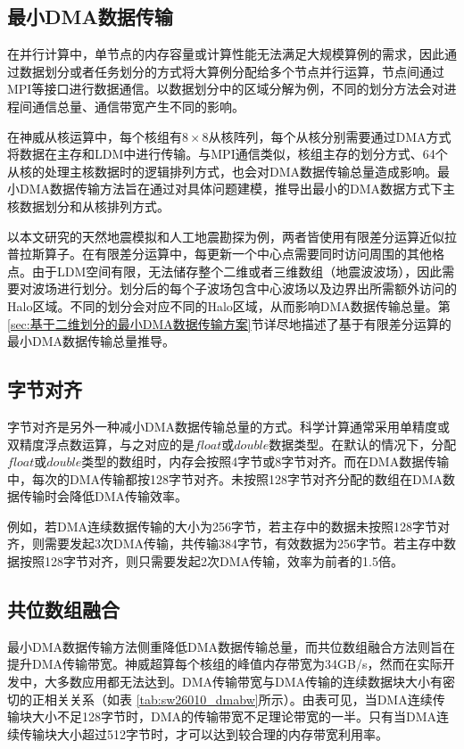 \documentclass[degree=doctor]{thuthesis}
\begin{document}
\subsection{最小DMA数据传输}

在并行计算中，单节点的内存容量或计算性能无法满足大规模算例的需求，因此通过数据划分或者任务划分的方式将大算例分配给多个节点并行运算，节点间通过MPI等接口进行数据通信。以数据划分中的区域分解为例，不同的划分方法会对进程间通信总量、通信带宽产生不同的影响。

在神威从核运算中，每个核组有$8\times8$从核阵列，每个从核分别需要通过DMA方式将数据在主存和LDM中进行传输。与MPI通信类似，核组主存的划分方式、64个从核的处理主核数据时的逻辑排列方式，也会对DMA数据传输总量造成影响。最小DMA数据传输方法旨在通过对具体问题建模，推导出最小的DMA数据方式下主核数据划分和从核排列方式。

以本文研究的天然地震模拟和人工地震勘探为例，两者皆使用有限差分运算近似拉普拉斯算子。在有限差分运算中，每更新一个中心点需要同时访问周围的其他格点。由于LDM空间有限，无法储存整个二维或者三维数组（地震波波场），因此需要对波场进行划分。划分后的每个子波场包含中心波场以及边界出所需额外访问的Halo区域。不同的划分会对应不同的Halo区域，从而影响DMA数据传输总量。第\ref{sec:基于二维划分的最小DMA数据传输方案}节详尽地描述了基于有限差分运算的最小DMA数据传输总量推导。


\subsection{字节对齐}

字节对齐是另外一种减小DMA数据传输总量的方式。科学计算通常采用单精度或双精度浮点数运算，与之对应的是$float$或$double$数据类型。在默认的情况下，分配$float$或$double$类型的数组时，内存会按照4字节或8字节对齐。而在DMA数据传输中，每次的DMA传输都按128字节对齐。未按照128字节对齐分配的数组在DMA数据传输时会降低DMA传输效率。

例如，若DMA连续数据传输的大小为256字节，若主存中的数据未按照128字节对齐，则需要发起3次DMA传输，共传输384字节，有效数据为256字节。若主存中数据按照128字节对齐，则只需要发起2次DMA传输，效率为前者的1.5倍。

\subsection{共位数组融合}

最小DMA数据传输方法侧重降低DMA数据传输总量，而共位数组融合方法则旨在提升DMA传输带宽。神威超算每个核组的峰值内存带宽为34GB/s，然而在实际开发中，大多数应用都无法达到。DMA传输带宽与DMA传输的连续数据块大小有密切的正相关关系（如表
\ref{tab:sw26010_dmabw}所示）。由表可见，当DMA连续传输块大小不足128字节时，DMA的传输带宽不足理论带宽的一半。只有当DMA连续传输块大小超过512字节时，才可以达到较合理的内存带宽利用率。
\end{document}
